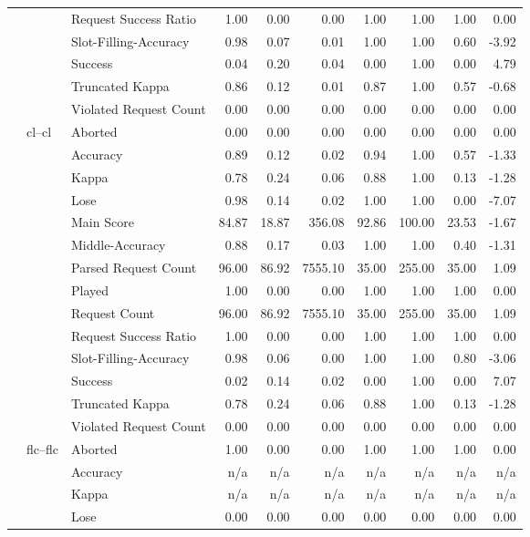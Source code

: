 \begin{tabular}{lllrrrrrrr}
 &  & Request Success Ratio & 1.00 & 0.00 & 0.00 & 1.00 & 1.00 & 1.00 & 0.00 \\
 &  & Slot-Filling-Accuracy & 0.98 & 0.07 & 0.01 & 1.00 & 1.00 & 0.60 & -3.92 \\
 &  & Success & 0.04 & 0.20 & 0.04 & 0.00 & 1.00 & 0.00 & 4.79 \\
 &  & Truncated Kappa & 0.86 & 0.12 & 0.01 & 0.87 & 1.00 & 0.57 & -0.68 \\
 &  & Violated Request Count & 0.00 & 0.00 & 0.00 & 0.00 & 0.00 & 0.00 & 0.00 \\
\cline{2-10}
 & \multirow[t]{14}{*}{cl--cl} & Aborted & 0.00 & 0.00 & 0.00 & 0.00 & 0.00 & 0.00 & 0.00 \\
 &  & Accuracy & 0.89 & 0.12 & 0.02 & 0.94 & 1.00 & 0.57 & -1.33 \\
 &  & Kappa & 0.78 & 0.24 & 0.06 & 0.88 & 1.00 & 0.13 & -1.28 \\
 &  & Lose & 0.98 & 0.14 & 0.02 & 1.00 & 1.00 & 0.00 & -7.07 \\
 &  & Main Score & 84.87 & 18.87 & 356.08 & 92.86 & 100.00 & 23.53 & -1.67 \\
 &  & Middle-Accuracy & 0.88 & 0.17 & 0.03 & 1.00 & 1.00 & 0.40 & -1.31 \\
 &  & Parsed Request Count & 96.00 & 86.92 & 7555.10 & 35.00 & 255.00 & 35.00 & 1.09 \\
 &  & Played & 1.00 & 0.00 & 0.00 & 1.00 & 1.00 & 1.00 & 0.00 \\
 &  & Request Count & 96.00 & 86.92 & 7555.10 & 35.00 & 255.00 & 35.00 & 1.09 \\
 &  & Request Success Ratio & 1.00 & 0.00 & 0.00 & 1.00 & 1.00 & 1.00 & 0.00 \\
 &  & Slot-Filling-Accuracy & 0.98 & 0.06 & 0.00 & 1.00 & 1.00 & 0.80 & -3.06 \\
 &  & Success & 0.02 & 0.14 & 0.02 & 0.00 & 1.00 & 0.00 & 7.07 \\
 &  & Truncated Kappa & 0.78 & 0.24 & 0.06 & 0.88 & 1.00 & 0.13 & -1.28 \\
 &  & Violated Request Count & 0.00 & 0.00 & 0.00 & 0.00 & 0.00 & 0.00 & 0.00 \\
\cline{2-10}
 & \multirow[t]{13}{*}{flc--flc} & Aborted & 1.00 & 0.00 & 0.00 & 1.00 & 1.00 & 1.00 & 0.00 \\
 &  & Accuracy & n/a & n/a & n/a & n/a & n/a & n/a & n/a \\
 &  & Kappa & n/a & n/a & n/a & n/a & n/a & n/a & n/a \\
 &  & Lose & 0.00 & 0.00 & 0.00 & 0.00 & 0.00 & 0.00 & 0.00 \\

\end{tabular}
